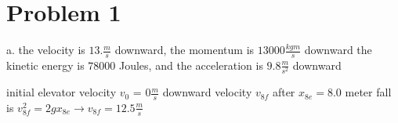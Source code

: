 \chapter{Problem 1}
\label{Problem 1}
a. the velocity is $13. \frac{m}{s}$ downward, the momentum is $13000 \frac{kg m}{s}$ downward
   the kinetic energy is $78000$ Joules, and the acceleration is $9.8 \frac{m}{s^{2}}$ downward
                           
initial elevator velocity $v_{0}$ = $0 \frac{m}{s}$
downward velocity $v_{8f}$ after $x_{8e} = 8.0$ meter fall is
$v_{8f}^{2} = 2gx_{8e} \rightarrow v_{8f} = 12.5 \frac{m}{s}$
                                      
